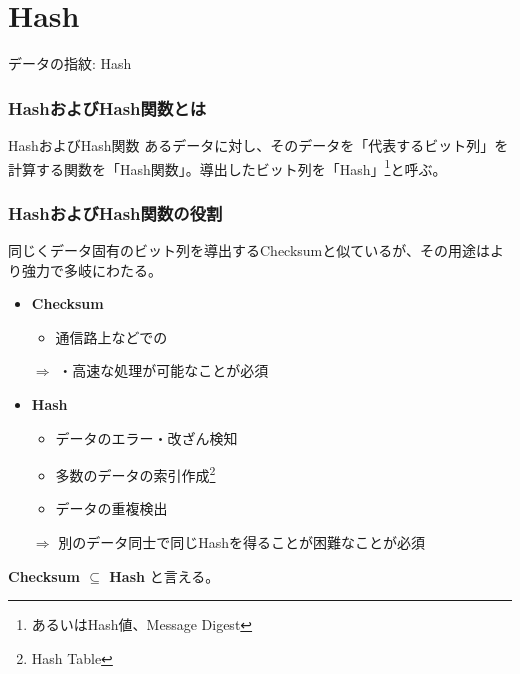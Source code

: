 \documentclass[12pt,dvipdfmx]{beamer}
\begin{document}
\section{Hash}
\begin{frame}
\centering
{\Large データの指紋: Hash}
\end{frame}

\begin{frame}
\frametitle{HashおよびHash関数とは}
\begin{block}{\small HashおよびHash関数}
あるデータに対し、そのデータを「代表するビット列」を計算する関数を「Hash関数」。導出したビット列を「Hash」\footnote[frame]{あるいはHash値、Message Digest}と呼ぶ。
\end{block}
\end{frame}

\begin{frame}
\small
\frametitle{HashおよびHash関数の役割}
同じくデータ固有のビット列を導出するChecksumと似ているが、その用途はより強力で多岐にわたる。

\begin{itemize}
 \item \textbf{Checksum}
\begin{itemize}
 \item 通信路上などでの
\end{itemize}
$\Rightarrow$ ・高速な処理が可能なことが必須
 \item \textbf{Hash}
\begin{itemize}
 \item \alert{データのエラー・改ざん検知} 
 \item 多数のデータの索引作成\footnote[frame]{Hash Table} 
 \item データの重複検出
\end{itemize}
$\Rightarrow$ \alert{別のデータ同士で同じHashを得ることが困難}なことが必須
\end{itemize}

\textbf{Checksum $\subseteq$ Hash} と言える。
\end{frame}
\end{document}
